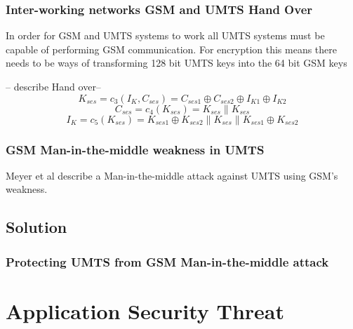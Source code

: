 \documentclass{beamer}
\begin{document}
	\begin{frame}
	
	\frametitle{Inter-working networks GSM and UMTS Hand Over}
	
	
	In order for GSM and UMTS systems to work all UMTS systems must be capable of performing GSM communication. For encryption this means there needs to be ways of transforming 128 bit UMTS keys into the 64 bit GSM keys 
	
	-- describe Hand over--
		\begin{equation}
			\label{C_3}
			\mathit{K_{ses} = c_{3}(I_{K},C_{ses}) = C_{ses1} \oplus 					C_{ses2}\oplus I_{K1} \oplus I_{K2}}
		\end{equation}
		\begin{equation} 
			\label{C_4}
			\mathit{C_{ses} = c_{4}(K_{ses}) = K_{ses} \| K_{ses}}
		\end{equation}
		\begin{equation}
			\label{C_5}
			\mathit{I_{K} = c_{5}(K_{ses}) = K_{ses1}\oplus K_{ses2}\|					K_{ses}\|K_{ses1}\oplus K_{ses2}}
		\end{equation}
	
\end{frame}	
		
\begin{frame}
	\frametitle{GSM Man-in-the-middle weakness in UMTS}
	Meyer et al describe a Man-in-the-middle attack against UMTS using GSM's weakness.
	\\
	
\end{frame}
\subsection{Solution}
\begin{frame}
\frametitle{Protecting UMTS from GSM Man-in-the-middle attack}
\end{frame}
\section{Application Security Threat}
\end{document}
